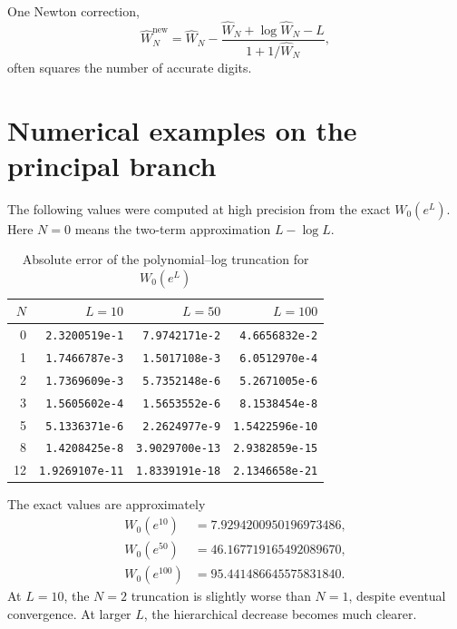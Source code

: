 \documentclass[11pt,openany]{book}
\theoremstyle{definition}
\theoremstyle{plain}
\theoremstyle{remark}
\begin{document}
One Newton correction,
\begin{equation}\label{eq:W-one-Newton}
 \widehat W_N^{\mathrm{new}}
 =\widehat W_N-
 \frac{\widehat W_N+\log\widehat W_N-L}
 {1+1/\widehat W_N},
\end{equation}
often squares the number of accurate digits.

\section{Numerical examples on the principal branch}
The following values were computed at high precision from the exact \(W_0(e^L)\). Here \(N=0\) means the two-term approximation \(L-\log L\).

\begin{table}[htbp]
\centering
\caption{Absolute error of the polynomial--log truncation for \(W_0(e^L)\)}\label{tab:W-errors}
\footnotesize
\begin{tabular}{@{}r@{\qquad}r@{\qquad}r@{\qquad}r@{}}
\toprule
\(N\) & \(L=10\) & \(L=50\) & \(L=100\)\\
\midrule
0  & \texttt{2.3200519e-1}  & \texttt{7.9742171e-2}  & \texttt{4.6656832e-2}\\
1  & \texttt{1.7466787e-3}  & \texttt{1.5017108e-3}  & \texttt{6.0512970e-4}\\
2  & \texttt{1.7369609e-3}  & \texttt{5.7352148e-6}  & \texttt{5.2671005e-6}\\
3  & \texttt{1.5605602e-4}  & \texttt{1.5653552e-6}  & \texttt{8.1538454e-8}\\
5  & \texttt{5.1336371e-6}  & \texttt{2.2624977e-9}  & \texttt{1.5422596e-10}\\
8  & \texttt{1.4208425e-8}  & \texttt{3.9029700e-13} & \texttt{2.9382859e-15}\\
12 & \texttt{1.9269107e-11} & \texttt{1.8339191e-18} & \texttt{2.1346658e-21}\\
\bottomrule
\end{tabular}
\end{table}

The exact values are approximately
\begin{align*}
 W_0(e^{10})&=7.9294200950196973486,\\
 W_0(e^{50})&=46.167719165492089670,\\
 W_0(e^{100})&=95.441486645575831840.
\end{align*}
At \(L=10\), the \(N=2\) truncation is slightly worse than \(N=1\), despite eventual convergence. At larger \(L\), the hierarchical decrease becomes much clearer.
\end{document}
